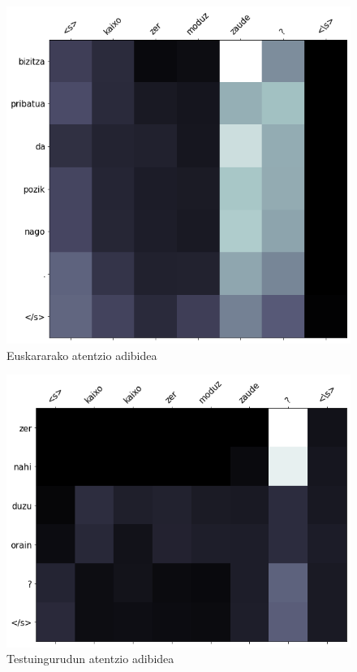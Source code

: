 \documentclass[11pt,a4paper]{article}
\begin{document}
\begin{figure}[ht]
    \centering
    \includegraphics[width=\linewidth]{attention_eu}
    \caption{Euskararako atentzio adibidea}
    \label{fig:attention_eu}
\end{figure}

\begin{figure}[ht]
    \centering
    \includegraphics[width=\linewidth]{attention_context}
    \caption{Testuingurudun atentzio adibidea}
    \label{fig:attention_context}
\end{figure}
\end{document}
